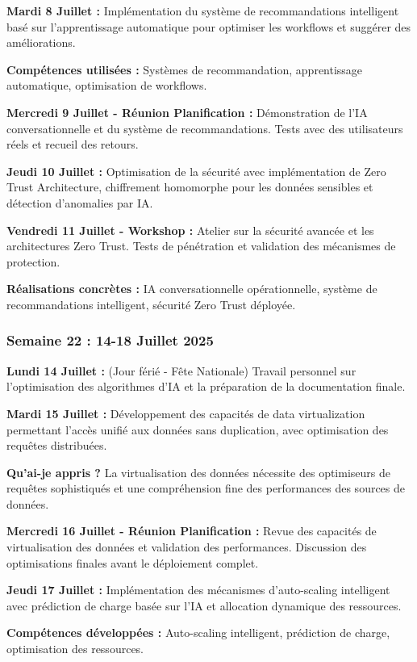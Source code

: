 \documentclass[a4paper,12pt]{article}
\begin{document}
\textbf{Mardi 8 Juillet :}
Implémentation du système de recommandations intelligent basé sur l'apprentissage automatique pour optimiser les workflows et suggérer des améliorations.

\textbf{Compétences utilisées :} Systèmes de recommandation, apprentissage automatique, optimisation de workflows.

\textbf{Mercredi 9 Juillet - Réunion Planification :}
Démonstration de l'IA conversationnelle et du système de recommandations. Tests avec des utilisateurs réels et recueil des retours.

\textbf{Jeudi 10 Juillet :}
Optimisation de la sécurité avec implémentation de Zero Trust Architecture, chiffrement homomorphe pour les données sensibles et détection d'anomalies par IA.

\textbf{Vendredi 11 Juillet - Workshop :}
Atelier sur la sécurité avancée et les architectures Zero Trust. Tests de pénétration et validation des mécanismes de protection.

\textbf{Réalisations concrètes :} IA conversationnelle opérationnelle, système de recommandations intelligent, sécurité Zero Trust déployée.

\subsubsection{Semaine 22 : 14-18 Juillet 2025}

\textbf{Lundi 14 Juillet :} (Jour férié - Fête Nationale)
Travail personnel sur l'optimisation des algorithmes d'IA et la préparation de la documentation finale.

\textbf{Mardi 15 Juillet :}
Développement des capacités de data virtualization permettant l'accès unifié aux données sans duplication, avec optimisation des requêtes distribuées.

\textbf{Qu'ai-je appris ?} La virtualisation des données nécessite des optimiseurs de requêtes sophistiqués et une compréhension fine des performances des sources de données.

\textbf{Mercredi 16 Juillet - Réunion Planification :}
Revue des capacités de virtualisation des données et validation des performances. Discussion des optimisations finales avant le déploiement complet.

\textbf{Jeudi 17 Juillet :}
Implémentation des mécanismes d'auto-scaling intelligent avec prédiction de charge basée sur l'IA et allocation dynamique des ressources.

\textbf{Compétences développées :} Auto-scaling intelligent, prédiction de charge, optimisation des ressources.
\end{document}
